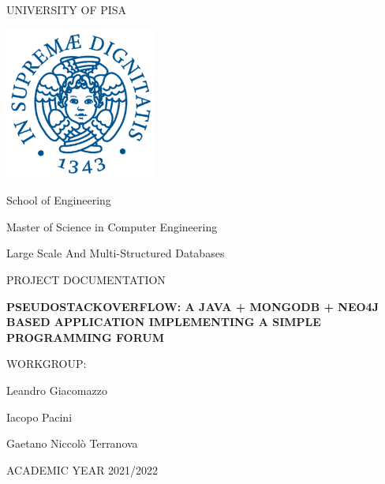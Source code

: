 \documentclass[11pt]{report}
\begin{document}
{
  \begin{titlepage}
  	\centering
  	{\huge UNIVERSITY OF PISA\par}
  	\vspace{1cm}
  	\includegraphics[width=5cm]{img/cherubino.png}\par
  	\vspace{1cm}
  	{\LARGE School of Engineering \par}
  	\vspace{0.5cm}
  	{\LARGE Master of Science in Computer Engineering\par}
  	\vspace{0.5cm}
  	{\LARGE Large Scale And Multi-Structured Databases\par}
  	\vspace{1.5cm}
  	{\large PROJECT DOCUMENTATION\par}
  	{\LARGE \textbf{PSEUDOSTACKOVERFLOW: A JAVA + MONGODB + NEO4J BASED APPLICATION IMPLEMENTING A SIMPLE PROGRAMMING FORUM}\par}
  	\vspace{2.5cm}
  	\begin{flushleft}
  	\large{WORKGROUP:\par}
  	\vspace{0.2cm}
  	\large{Leandro Giacomazzo\par}
  	\vspace{0.2cm}
  	\large{Iacopo Pacini\par}
  	\vspace{0.2cm}
  	\large{Gaetano Niccolò Terranova\par}
  	\end{flushleft}
  	\vfill

  	{\large ACADEMIC YEAR 2021/2022\par}
  \end{titlepage}
}

\addtocounter{page}{1}

\tableofcontents
\end{document}
